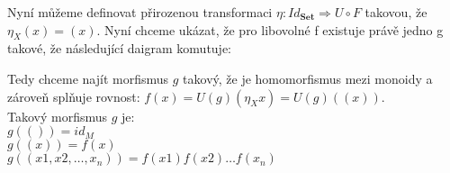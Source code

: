 \documentclass{article}
\begin{document}
Nyní můžeme definovat přirozenou transformaci $\eta: Id_{\textbf{Set}} \Rightarrow U \circ F$ takovou, že $\eta_X(x) = (x)$.
Nyní chceme ukázat, že pro libovolné f existuje právě jedno g takové, že následující daigram komutuje:\\
\begin{center}
\end{center}
Tedy chceme najít morfismus $g$ takový, že je homomorfismus mezi monoidy a zároveň splňuje rovnost:
$f(x)=U(g)(\eta_Xx) = U(g)((x))$.\\
Takový morfismus $g$ je:\\
\indent$g(()) = id_M$\\
\indent$g((x)) = f(x)$\\
\indent$g((x1,x2,…,x_n ))=f(x1)f(x2)…f(x_n)$\\
\end{document}
